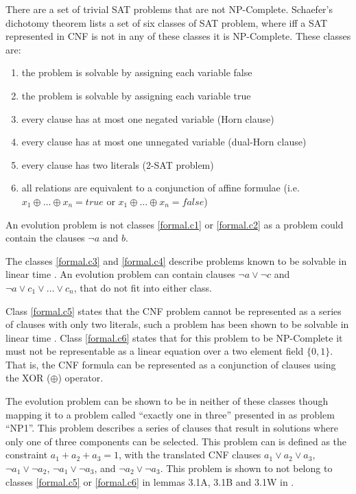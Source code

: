 There are a set of trivial SAT problems that are not NP-Complete.
Schaefer's dichotomy theorem \citep{Schaefer1978} lists a set of six classes of SAT problem, where iff a SAT represented in CNF is not in any of these classes it is NP-Complete.
These classes are:
\begin{enumerate}
  \item the problem is solvable by assigning each variable false \label{formal.c1}
  \item the problem is solvable by assigning each variable true \label{formal.c2}
  \item every clause has at most one negated variable (Horn clause) \label{formal.c3}
  \item every clause has at most one unnegated variable (dual-Horn clause) \label{formal.c4}
  \item every clause has two literals (2-SAT problem) \label{formal.c5}
  \item all relations are equivalent to a conjunction of affine formulae (i.e. $x_1 \oplus \ldots \oplus x_n = true$ or $x_1 \oplus \ldots \oplus x_n = false$) \label{formal.c6}
\end{enumerate} 

An evolution problem is not classes \ref{formal.c1} or \ref{formal.c2} as a problem could contain the clauses $\neg a$ and $b$. 

The classes \ref{formal.c3} and \ref{formal.c4} describe problems known to be solvable in linear time \citep{dowling1984linear}.
An evolution problem can contain clauses $\neg a \vee \neg c$ and $\neg a \vee c_1 \vee \ldots \vee c_n$, that do not fit into either class.

Class \ref{formal.c5} states that the CNF problem cannot be represented as a series of clauses with only two literals,
such a problem has been shown to be solvable in linear time \citep{aspvall1979linear}.
Class \ref{formal.c6} states that for this problem to be NP-Complete it must not be representable as a linear equation over a two element field $\{0,1\}$.
That is, the CNF formula can be represented as a conjunction of clauses using the XOR ($\oplus$) operator.
 
The evolution problem can be shown to be in neither of these classes though mapping it to a problem called ``exactly one in three'' presented in \citep{Schaefer1978} as problem ``NP1''.
This problem describes a series of clauses that result in solutions where only one of three components can be selected. 
This problem can is defined as the constraint $a_1 + a_2 + a_3 = 1$,  
with the translated CNF clauses $a_1 \vee a_2 \vee a_3$, $\neg a_1 \vee \neg a_2$, $\neg a_1 \vee \neg a_3$, and $\neg a_2 \vee \neg a_3$.
This problem is shown to not belong to classes \ref{formal.c5} or \ref{formal.c6} in lemmas 3.1A, 3.1B and 3.1W in \citep{Schaefer1978}.

